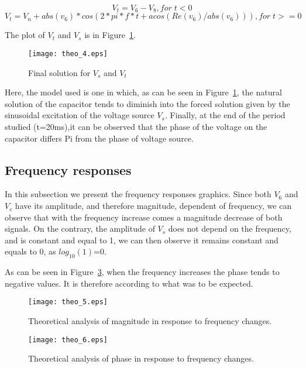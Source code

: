 \begin {equation}
V_t = V_6 - V_8, for\;t<0
\end {equation}
\begin {equation}
V_t = V_n + abs(v_6) * cos(2 * pi * f * t + acos(Re(v_6) / abs(v_6))), for\;t>=0
\end {equation}

The plot of $V_t$ and $V_s$ is in Figure~\ref{fig:final}.

\begin{figure}[H] \centering
\texttt{[image: theo\_4.eps]}
\caption{Final solution for $V_s$ and $V_t$}
\label{fig:final}
\end{figure}

Here, the model used is one in which, as can be seen in Figure~\ref{fig:final}, the natural solution of the capacitor tends to diminish into the forced solution given by the sinusoidal excitation of the voltage source $V_s$. Finally, at the end of the period studied (t=20ms),it can be observed that the phase of the voltage on the capacitor differs Pi from the phase of voltage source. 

\subsection{Frequency responses}
\tab In this subsection we present the frequency responses graphics. Since both $V_6$ and $V_c$ have its amplitude, and therefore magnitude, dependent of frequency, we can observe that with the frequency increase comes a magnitude decrease of both signals. On the contrary, the amplitude of $V_s$ does not depend on the frequency, and is constant and equal to 1, we can then observe it remains constant and equals to 0, as $log_{10}(1)$=0.

As can be seen in Figure~\ref{fig:theo_ph}, when the frequency increases the phase tends to negative values. It is therefore according to what was to be expected.

\begin{figure}[H] \centering
\texttt{[image: theo\_5.eps]}
\caption{Theoretical analysis of magnitude in response to frequency changes.}
\label{fig:theo_db}
\end{figure}

\begin{figure}[H] \centering
\texttt{[image: theo\_6.eps]}
\caption{Theoretical analysis of phase in response to frequency changes.}
\label{fig:theo_ph}
\end{figure} 

